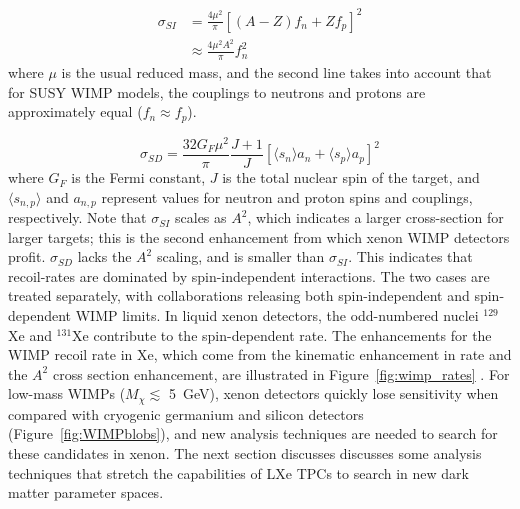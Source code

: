 \begin{equation}
\begin{split}
\sigma_{SI} &= \frac{4 \mu^{2} }{\pi} [ (A-Z) f_{n} + Zf_{p}]^{2} \\
 & \approx \frac{4 \mu^{2} A^{2}}{\pi} f_{n}^{2}
\end{split}
\end{equation}
where $\mu$ is the usual reduced mass, and the second line takes into account that for \ac{SUSY} \ac{WIMP} models, the couplings to neutrons and protons are approximately equal ($f_{n} \approx f_{p}$).

\begin{equation}
\sigma_{SD} = \frac{32 G_{F} \mu^{2}}{\pi} \frac{J+1}{J} [\langle s_{n} \rangle a_{n} + \langle s_{p} \rangle a_{p}] ^{2}
\end{equation}
where $G_{F}$ is the Fermi constant, $J$ is the total nuclear spin of the target, and $\langle s_{n,p} \rangle$ and $a_{n,p}$ represent values for neutron and proton spins and couplings, respectively. Note that $\sigma_{SI}$ scales as $A^{2}$, which indicates a larger cross-section for larger targets; this is the second enhancement from which xenon \ac{WIMP} detectors profit. $\sigma_{SD}$ lacks the $A^{2}$ scaling, and is smaller than $\sigma_{SI}$. This indicates that recoil-rates are dominated by spin-independent interactions. The two cases are treated separately, with collaborations releasing both spin-independent and spin-dependent \ac{WIMP} limits. In liquid xenon detectors, the odd-numbered nuclei $^{129}$Xe and $^{131}$Xe contribute to the spin-dependent rate. The enhancements for the \ac{WIMP} recoil rate in Xe, which come from the kinematic enhancement in rate and the $A^{2}$ cross section enhancement, are illustrated in Figure~\ref{fig:wimp_rates} \cite{Chepel2013}. For low-mass \ac{WIMP}s ($M_{\chi} \lesssim $ 5~GeV), xenon detectors quickly lose sensitivity when compared with cryogenic germanium and silicon detectors (Figure~\ref{fig:WIMPblobs}), and new analysis techniques are needed to search for these candidates in xenon. The next section discusses discusses some analysis techniques that stretch the capabilities of \ac{LXe} \ac{TPC}s to search in new dark matter parameter spaces.


